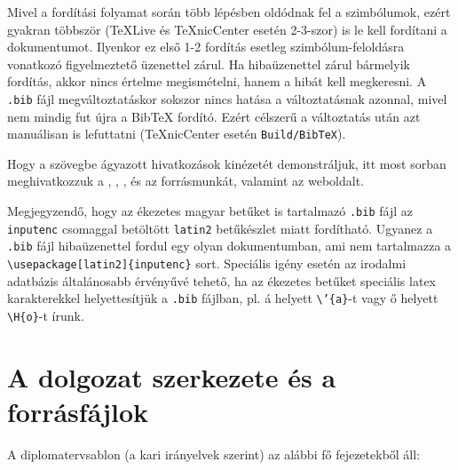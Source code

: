 \documentclass[11pt,magyar,a4paper,oneside,]{report}
\begin{document}
Mivel a fordítási folyamat során több lépésben oldódnak fel a
szimbólumok, ezért gyakran többször (TeXLive és TeXnicCenter esetén
2-3-szor) is le kell fordítani a dokumentumot. Ilyenkor ez első 1-2
fordítás esetleg szimbólum-feloldásra vonatkozó figyelmeztető üzenettel
zárul. Ha hibaüzenettel zárul bármelyik fordítás, akkor nincs értelme
megismételni, hanem a hibát kell megkeresni. A \texttt{.bib} fájl
megváltoztatáskor sokszor nincs hatása a változtatásnak azonnal, mivel
nem mindig fut újra a BibTeX fordító. Ezért célszerű a változtatás után
azt manuálisan is lefuttatni (TeXnicCenter esetén
\texttt{Build/BibTeX}).

Hogy a szövegbe ágyazott hivatkozások kinézetét demonstráljuk, itt most
sorban meghivatkozzuk a \citep{Wettl04}, \citep{Candy86}, \citep{Lee87},
\citep{KissPhD} és az \citep{Schreier00} forrásmunkát, valamint az
\citep{DipPortal} weboldalt.

Megjegyzendő, hogy az ékezetes magyar betűket is tartalmazó
\texttt{.bib} fájl az \texttt{inputenc} csomaggal betöltött
\texttt{latin2} betűkészlet miatt fordítható. Ugyanez a \texttt{.bib}
fájl hibaüzenettel fordul egy olyan dokumentumban, ami nem tartalmazza a
\texttt{\textbackslash{}usepackage{[}latin2{]}\{inputenc\}} sort.
Speciális igény esetén az irodalmi adatbázis általánosabb érvényűvé
tehető, ha az ékezetes betűket speciális latex karakterekkel
helyettesítjük a \texttt{.bib} fájlban, pl. á helyett
\texttt{\textbackslash{}'\{a\}}-t vagy ő helyett
\texttt{\textbackslash{}H\{o\}}-t írunk.

\section{A dolgozat szerkezete és a
forrásfájlok}\label{a-dolgozat-szerkezete-uxe9s-a-forruxe1sfuxe1jlok}

A diplomatervsablon (a kari irányelvek szerint) az alábbi fő
fejezetekből áll:
\end{document}
